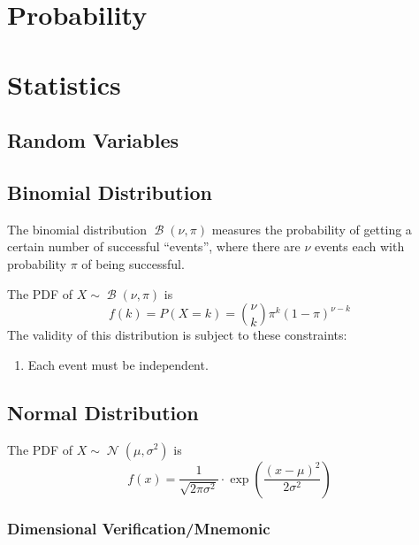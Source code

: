\documentclass[fleqn,a4paper,11pt]{article}
\DeclareMathOperator{\Normal}{\mathcal{N}}
\DeclareMathOperator{\Binomial}{\mathcal{B}}
\begin{document}
    \section{Probability}

    \section{Statistics}

    \subsection{Random Variables}

    \subsection{Binomial Distribution}


    The binomial distribution \(\Binomial(\nu, \pi)\) measures the probability of
    getting a certain number of successful ``events'', where there are \(\nu\)
    events each with probability \(\pi\) of being successful.

    The PDF of \(X \sim \Binomial(\nu, \pi)\) is
    \begin{equation}
    f(k) = P(X = k) = {\nu \choose k} \pi^k (1 - \pi)^{\nu - k}
    \end{equation}
    The validity of this distribution is subject to these constraints:
    \begin{enumerate}
    \item Each event must be independent.
    \end{enumerate}

    \subsection{Normal Distribution}


    The PDF of \(X \sim \Normal(\mu, \sigma^2)\) is
    \begin{equation}
    f(x) = \frac{1}{\sqrt{2\pi\sigma^2}} \cdot
           \exp(\frac{(x - \mu)^2}{2\sigma^2})
    \end{equation}

    \subsubsection{Dimensional Verification/Mnemonic}
\end{document}
